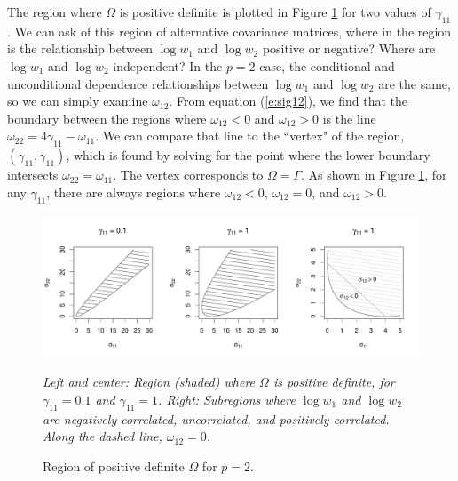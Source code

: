 \documentclass[12pt]{article}
\newcommand{\var}{\operatorname{var}}
\begin{document}

The region where $\Omega$ is positive definite is plotted in Figure \ref{f:regions} for two values of $\gamma_{11}$. We can ask of this region of alternative covariance matrices, where in the region is the relationship between $\log w_1$ and $\log w_2$ positive or negative? Where are $\log w_1$ and $\log w_2$ independent? In the $p = 2$ case, the conditional and unconditional dependence relationships between $\log w_1$ and $\log w_2$ are the same, so we can simply examine $\omega_{12}$. From equation (\ref{e:sig12}), we find that the boundary between the regions where $\omega_{12} < 0$ and $\omega_{12} > 0$ is the line $\omega_{22} = 4\gamma_{11} - \omega_{11}$. We can compare that line to the ``vertex" of the region, $(\gamma_{11}, \gamma_{11})$, which is found by solving for the point where the lower boundary intersects $\omega_{22} = \omega_{11}$. The vertex corresponds to $\Omega = \Gamma$. As shown in Figure \ref{f:regions}, for any $\gamma_{11}$, there are always regions where $\omega_{12} < 0$, $\omega_{12} = 0$, and $\omega_{12} > 0$.

\begin{figure}
\caption{Region of positive definite $\Omega$ for $p=2$.}
\label{f:regions}
\begin{center}
\includegraphics[width=6.5in]{figs/regions-2.pdf}
\begin{small}
\textit{Left and center: Region (shaded) where $\Omega$ is positive definite, for $\gamma_{11} = 0.1$ and $\gamma_{11} = 1$. Right: Subregions where $\log w_1$ and $\log w_2$ are negatively correlated, uncorrelated, and positively correlated. Along the dashed line, $\omega_{12} = 0$.}
\end{small}
\end{center}
\end{figure}
\end{document}
